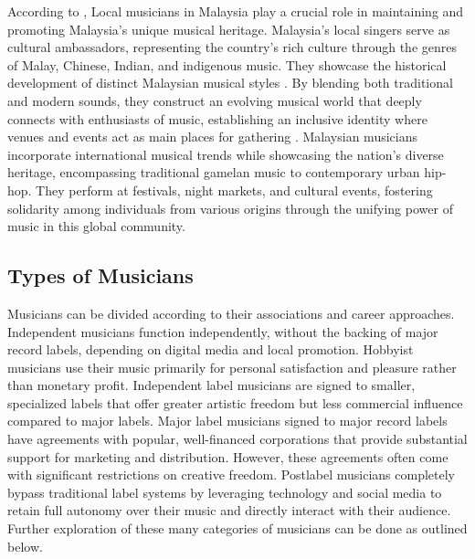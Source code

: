 According to \textcite{mohd21}, Local musicians in Malaysia play a crucial role in maintaining and promoting Malaysia's unique musical heritage. Malaysia's local singers serve as cultural ambassadors, representing the country's rich culture through the genres of Malay, Chinese, Indian, and indigenous music. They showcase the historical development of distinct Malaysian musical styles \parencite{mohd21}. By blending both traditional and modern sounds, they construct an evolving musical world that deeply connects with enthusiasts of music, establishing an inclusive identity where venues and events act as main places for gathering \parencite{ong19}. Malaysian musicians incorporate international musical trends while showcasing the nation's diverse heritage, encompassing traditional gamelan music to contemporary urban hip-hop. They perform at festivals, night markets, and cultural events, fostering solidarity among individuals from various origins through the unifying power of music in this global community.

\subsection{Types of Musicians}
Musicians can be divided according to their associations and career approaches. Independent musicians function independently, without the backing of major record labels, depending on digital media and local promotion. Hobbyist musicians use their music primarily for personal satisfaction and pleasure rather than monetary profit. Independent label musicians are signed to smaller, specialized labels that offer greater artistic freedom but less commercial influence compared to major labels. Major label musicians signed to major record labels have agreements with popular, well-financed corporations that provide substantial support for marketing and distribution. However, these agreements often come with significant restrictions on creative freedom. Postlabel musicians completely bypass traditional label systems by leveraging technology and social media to retain full autonomy over their music and directly interact with their audience. Further exploration of these many categories of musicians can be done as outlined below.

